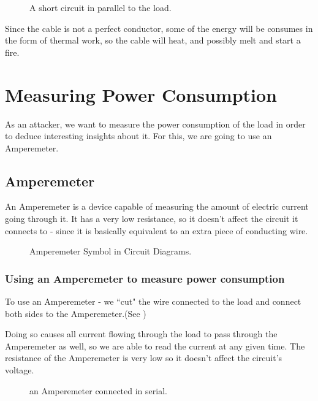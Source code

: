 \begin{figure}[!ht]
    \centering
    
    \caption{A short circuit in parallel to the load.} \label{fig:circuit4}
\end{figure}

Since the cable is not a perfect conductor, some of the energy will be consumes
in the form of thermal work, so the cable will heat, and possibly melt and start
a fire.

\section{Measuring Power Consumption}

As an attacker, we want to measure the power consumption of the load in order to deduce interesting insights about it.
For this, we are going to use an Amperemeter.

\subsection{Amperemeter}

An Amperemeter is a device capable of measuring the amount of electric current going through it. It has a very low
resistance, so it doesn't affect the circuit it connects to - since it is basically equivalent to an extra piece of conducting wire.

\begin{figure}[!ht]
    \centering
    
    \caption{Amperemeter Symbol in Circuit Diagrams.} \label{fig:ampermeter}
\end{figure}

\subsubsection{Using an Amperemeter to measure power consumption}

To use an Amperemeter - we ``cut" the wire connected to the load and connect both sides to the
Amperemeter.(See )

Doing so causes all current flowing through the load to pass through the
Amperemeter as well, so we are able to read the current at any given time.
The resistance of the Amperemeter is very low so it doesn't affect the circuit's voltage.

\begin{figure}[!ht]
    \centering
    
    \caption{an Amperemeter connected in serial.} \label{fig:circuit5}
\end{figure}

